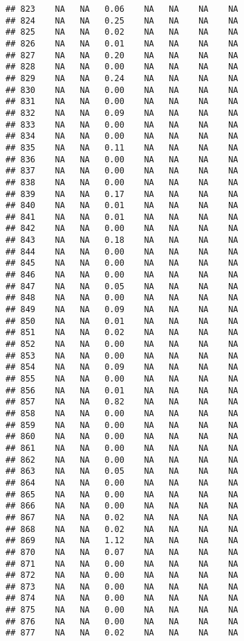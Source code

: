 \documentclass{article}\usepackage{graphicx, color}
\makeatletter
\newenvironment{kframe}{%
 \def\at@end@of@kframe{}%
 \ifinner\ifhmode%
  \def\at@end@of@kframe{\end{minipage}}%
  \begin{minipage}{\columnwidth}%
 \fi\fi%
 \def\FrameCommand##1{\hskip\@totalleftmargin \hskip-\fboxsep
 \colorbox{shadecolor}{##1}\hskip-\fboxsep
     \hskip-\linewidth \hskip-\@totalleftmargin \hskip\columnwidth}%
 \MakeFramed {\advance\hsize-\width
   \@totalleftmargin\z@ \linewidth\hsize
   \@setminipage}}%
 {\par\unskip\endMakeFramed%
 \at@end@of@kframe}
\newenvironment{knitrout}{}{} %
\makeatother
\begin{document}
\begin{knitrout}
\begin{kframe}
\begin{verbatim}
## 823    NA   NA   0.06    NA   NA    NA    NA
## 824    NA   NA   0.25    NA   NA    NA    NA
## 825    NA   NA   0.02    NA   NA    NA    NA
## 826    NA   NA   0.01    NA   NA    NA    NA
## 827    NA   NA   0.20    NA   NA    NA    NA
## 828    NA   NA   0.00    NA   NA    NA    NA
## 829    NA   NA   0.24    NA   NA    NA    NA
## 830    NA   NA   0.00    NA   NA    NA    NA
## 831    NA   NA   0.00    NA   NA    NA    NA
## 832    NA   NA   0.09    NA   NA    NA    NA
## 833    NA   NA   0.00    NA   NA    NA    NA
## 834    NA   NA   0.00    NA   NA    NA    NA
## 835    NA   NA   0.11    NA   NA    NA    NA
## 836    NA   NA   0.00    NA   NA    NA    NA
## 837    NA   NA   0.00    NA   NA    NA    NA
## 838    NA   NA   0.00    NA   NA    NA    NA
## 839    NA   NA   0.17    NA   NA    NA    NA
## 840    NA   NA   0.01    NA   NA    NA    NA
## 841    NA   NA   0.01    NA   NA    NA    NA
## 842    NA   NA   0.00    NA   NA    NA    NA
## 843    NA   NA   0.18    NA   NA    NA    NA
## 844    NA   NA   0.00    NA   NA    NA    NA
## 845    NA   NA   0.00    NA   NA    NA    NA
## 846    NA   NA   0.00    NA   NA    NA    NA
## 847    NA   NA   0.05    NA   NA    NA    NA
## 848    NA   NA   0.00    NA   NA    NA    NA
## 849    NA   NA   0.09    NA   NA    NA    NA
## 850    NA   NA   0.01    NA   NA    NA    NA
## 851    NA   NA   0.02    NA   NA    NA    NA
## 852    NA   NA   0.00    NA   NA    NA    NA
## 853    NA   NA   0.00    NA   NA    NA    NA
## 854    NA   NA   0.09    NA   NA    NA    NA
## 855    NA   NA   0.00    NA   NA    NA    NA
## 856    NA   NA   0.01    NA   NA    NA    NA
## 857    NA   NA   0.82    NA   NA    NA    NA
## 858    NA   NA   0.00    NA   NA    NA    NA
## 859    NA   NA   0.00    NA   NA    NA    NA
## 860    NA   NA   0.00    NA   NA    NA    NA
## 861    NA   NA   0.00    NA   NA    NA    NA
## 862    NA   NA   0.00    NA   NA    NA    NA
## 863    NA   NA   0.05    NA   NA    NA    NA
## 864    NA   NA   0.00    NA   NA    NA    NA
## 865    NA   NA   0.00    NA   NA    NA    NA
## 866    NA   NA   0.00    NA   NA    NA    NA
## 867    NA   NA   0.02    NA   NA    NA    NA
## 868    NA   NA   0.02    NA   NA    NA    NA
## 869    NA   NA   1.12    NA   NA    NA    NA
## 870    NA   NA   0.07    NA   NA    NA    NA
## 871    NA   NA   0.00    NA   NA    NA    NA
## 872    NA   NA   0.00    NA   NA    NA    NA
## 873    NA   NA   0.00    NA   NA    NA    NA
## 874    NA   NA   0.00    NA   NA    NA    NA
## 875    NA   NA   0.00    NA   NA    NA    NA
## 876    NA   NA   0.00    NA   NA    NA    NA
## 877    NA   NA   0.02    NA   NA    NA    NA

\end{verbatim}
\end{kframe}
\end{knitrout}
\end{document}
